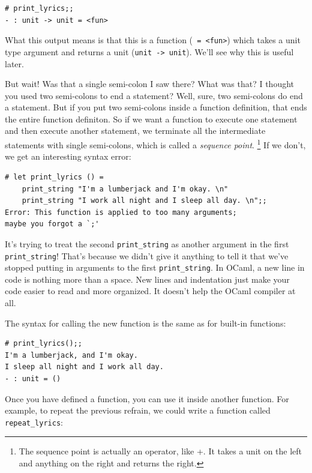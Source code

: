 \documentclass[10pt]{book}
\begin{document}
\beforeverb
\begin{verbatim}
# print_lyrics;;
- : unit -> unit = <fun>
\end{verbatim}
\afterverb
What this output means is that this is a function (\verb" = <fun>") which takes
a unit type argument and returns a unit (\verb"unit -> unit"). We'll see why this
is useful later.

But wait! Was that a single semi-colon I saw there? What was that? I thought
you used two semi-colons to end a statement? Well, sure, two semi-colons do
end a statement. But if you put two semi-colons inside a function definition, 
that ends the entire function definiton. So if we want a function to execute
one statement and then execute another statement, we terminate all the intermediate
statements with single semi-colons, which is called a {\em sequence point}. \footnote{
The sequence point is actually an operator, like +. It takes a unit on the 
left and anything on the right and returns the right.}
If we don't, we get an interesting syntax error:

\beforeverb
\begin{verbatim}
# let print_lyrics () = 
	print_string "I'm a lumberjack and I'm okay. \n"
	print_string "I work all night and I sleep all day. \n";;
Error: This function is applied to too many arguments;
maybe you forgot a `;'
\end{verbatim}
\afterverb
It's trying to treat the second \verb"print_string" as another argument in the first \verb"print_string"!
That's because we didn't give it anything to tell it that we've stopped putting in arguments
to the first \verb"print_string". In OCaml, a new line in code is nothing more than a space.
New lines and indentation just make your code easier to read and more organized. It doesn't
help the  OCaml compiler at all.


The syntax for calling the new function is the same as for built-in functions:

\beforeverb
\begin{verbatim}
# print_lyrics();;
I'm a lumberjack, and I'm okay.
I sleep all night and I work all day.
- : unit = ()
\end{verbatim}
\afterverb
%
Once you have defined a function, you can use it inside another
function.  For example, to repeat the previous refrain, we could write
a function called \verb"repeat_lyrics":
\end{document}
